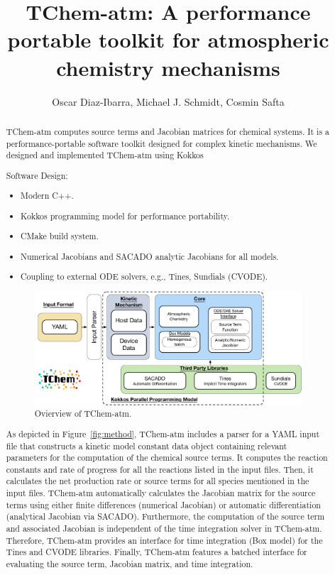 \documentclass[report, 12pt]{SANDreport}
\title{TChem-atm: A performance portable toolkit for atmospheric chemistry mechanisms}
\author{Oscar Diaz-Ibarra, Michael J. Schmidt, Cosmin Safta}
\date{}
\begin{document}
    \maketitle
\justifying

    \begin{abstract}
TChem-atm computes source terms and Jacobian matrices for chemical systems. It is a performance-portable software toolkit designed for complex kinetic mechanisms. We designed and implemented TChem-atm using Kokkos~\cite{kokkosweb,Carter:2014,Trott:2021:kokkos,Trott:2022:kokkos}

Software Design:
\begin{itemize}
  \item Modern C++.
  \item Kokkos programming model for performance portability.
  \item CMake build system.
  \item Numerical Jacobians and SACADO analytic Jacobians for all models.
  \item Coupling to external ODE solvers, e.g., Tines, Sundials (CVODE).
\end{itemize}

\begin{figure}[htp]
  \centering
  \includegraphics[width=1\textwidth]{../figures/TChem_atm.pdf}
  \caption{Ovierview of TChem-atm.}
\label{fig:method}
\end{figure}

As depicted in Figure~\ref{fig:method}, TChem-atm includes a parser for a YAML input file that constructs a kinetic model constant data object containing relevant parameters for the computation of the chemical source terms. It computes the reaction constants and rate of progress for all the reactions listed in the input files. Then, it calculates the net production rate or source terms for all species mentioned in the input files. TChem-atm automatically calculates the Jacobian matrix for the source terms using either finite differences (numerical Jacobian) or automatic differentiation (analytical Jacobian via SACADO). Furthermore, the computation of the source term and associated Jacobian is independent of the time integration solver in TChem-atm. Therefore, TChem-atm provides an interface for time integration (Box model) for the Tines and CVODE libraries. Finally, TChem-atm features a batched interface for evaluating the source term, Jacobian matrix, and time integration.

\end{abstract}
\end{document}
